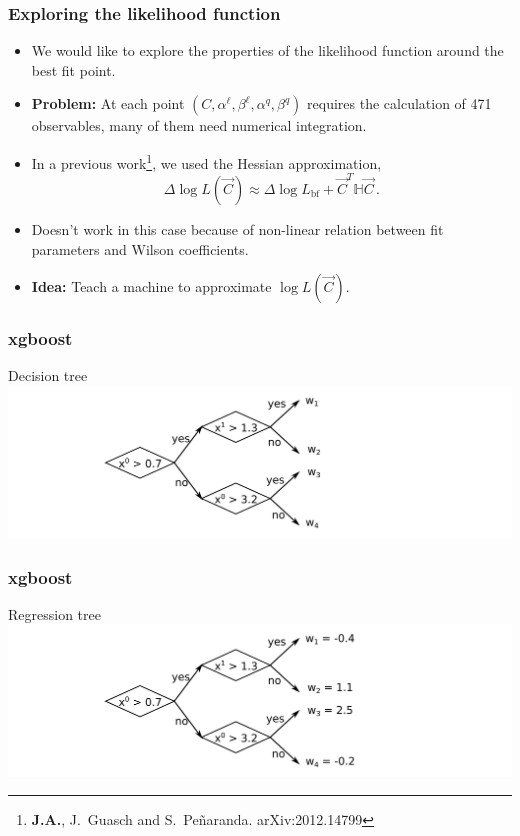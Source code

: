 \documentclass[mathserif, 10pt]{beamer}
\begin{document}
\begin{frame}
    \frametitle{Exploring the likelihood function}

    \begin{itemize}
        \item We would like to explore the properties of the likelihood function around the best fit point.
        \item {\bf Problem:} At each point $(C, \alpha^\ell, \beta^\ell, \alpha^q, \beta^q)$ requires the calculation of 471 observables, many of them need numerical integration.
        \item In a previous work\footnote[1]{\textbf{J.A.}, J.~Guasch and S.~Pe\~naranda. arXiv:2012.14799}, we used the Hessian approximation,
        $$\Delta\log L (\vec{C}) \approx \Delta\log L_\mathrm{bf} + \vec{C}^T \mathbb{H} \vec{C}\,.$$
        \item Doesn't work in this case because of non-linear relation between fit parameters and Wilson coefficients.
        \item {\bf Idea:} Teach a machine to approximate $\log L(\vec{C})$.
    \end{itemize}

\end{frame}

\begin{frame}
    \frametitle{xgboost}

    Decision tree
    \includegraphics[width=\textwidth]{figures/dectree.png}

\end{frame}

\begin{frame}
    \frametitle{xgboost}

    Regression tree
    \includegraphics[width=\textwidth]{figures/regtree_nof.png}

\end{frame}
\end{document}

